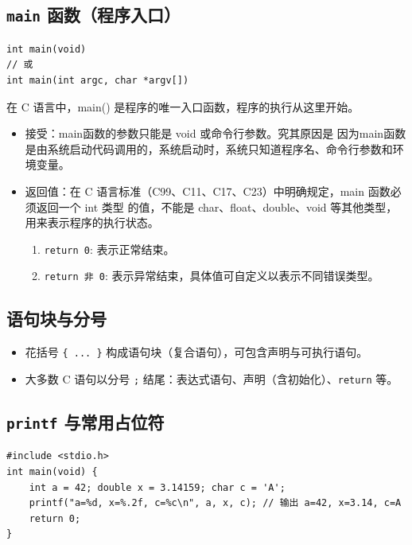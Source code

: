\subsection{\texttt{main} 函数（程序入口）}
\begin{lstlisting}[caption={常见main函数入口示例},label={lst:simple_main}]
int main(void)
// 或
int main(int argc, char *argv[])
\end{lstlisting}

\vspace{1em}%

在 C 语言中，main() 是程序的唯一入口函数，程序的执行从这里开始。

\vspace{1em}%


\begin{itemize}
  \item 接受：main函数的参数只能是 void 或命令行参数。究其原因是
  因为main函数是由系统启动代码调用的，系统启动时，系统只知道程序名、命令行参数和环境变量。
  
  \item 返回值：在 C 语言标准（C99、C11、C17、C23）中明确规定，main 函数必须返回一个 int 类型
的值，不能是 char、float、double、void 等其他类型，用来表示程序的执行状态。
\begin{enumerate}[label=\ding{\numexpr171+\arabic*}]%
  \item \texttt{return 0}: 表示正常结束。
  \item \texttt{return 非 0}: 表示异常结束，具体值可自定义以表示不同错误类型。
\end{enumerate}

\end{itemize}





\subsection{语句块与分号}
\begin{itemize}
  \item 花括号 \verb|{ ... }| 构成语句块（复合语句），可包含声明与可执行语句。
  \item 大多数 C 语句以分号 \texttt{;} 结尾：表达式语句、声明（含初始化）、\texttt{return} 等。
\end{itemize}

\subsection{\texttt{printf} 与常用占位符}
\begin{lstlisting}[caption={printf 与占位符示例}]
#include <stdio.h>
int main(void) {
    int a = 42; double x = 3.14159; char c = 'A';
    printf("a=%d, x=%.2f, c=%c\n", a, x, c); // 输出 a=42, x=3.14, c=A
    return 0;
}
\end{lstlisting}




